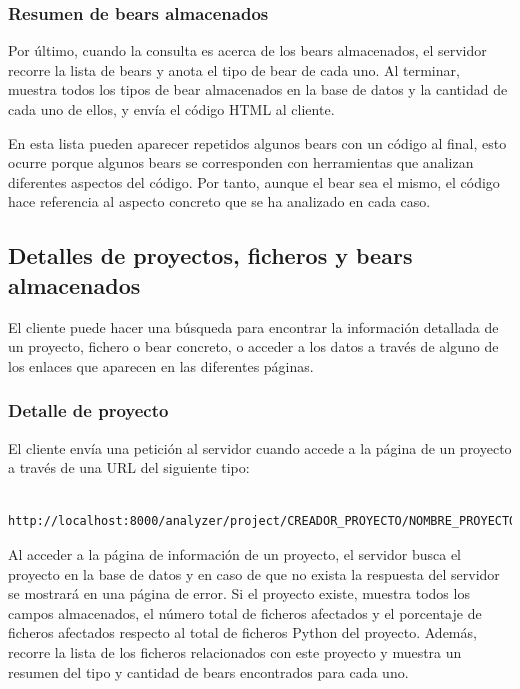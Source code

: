 \documentclass[a4paper, 12pt]{book}
\begin{document}
\subsubsection{Resumen de bears almacenados}
\label{sec:section12.3.3}
Por último, cuando la consulta es acerca de los bears almacenados, el servidor recorre la lista de bears y anota el tipo de bear de cada uno. Al terminar, muestra todos los tipos de bear almacenados en la base de datos y la cantidad de cada uno de ellos, y envía el código HTML al cliente. 

En esta lista pueden aparecer repetidos algunos bears con un código al final, esto ocurre porque algunos bears se corresponden con herramientas que analizan diferentes aspectos del código. Por tanto, aunque el bear sea el mismo, el código hace referencia al aspecto concreto que se ha analizado en cada caso.

\subsection{Detalles de proyectos, ficheros y bears almacenados}
\label{sec:seccion12.4}
El cliente puede hacer una búsqueda para encontrar la información detallada de un proyecto, fichero o bear concreto, o acceder a los datos a través de alguno de los enlaces que aparecen en las diferentes páginas.

\subsubsection{Detalle de proyecto}
\label{sec:section12.4.1}
El cliente envía una petición al servidor cuando accede a la página de un proyecto a través de una URL del siguiente tipo:

{\footnotesize
\begin{verbatim}
    http://localhost:8000/analyzer/project/CREADOR_PROYECTO/NOMBRE_PROYECTO
\end{verbatim}
}

Al acceder a la página de información de un proyecto, el servidor busca el proyecto en la base de datos y en caso de que no exista la respuesta del servidor se mostrará en una página de error. Si el proyecto existe, muestra todos los campos almacenados, el número total de ficheros afectados y el porcentaje de ficheros afectados respecto al total de ficheros Python del proyecto. Además, recorre la lista de los ficheros relacionados con este proyecto y muestra un resumen del tipo y cantidad de bears encontrados para cada uno.
\end{document}

